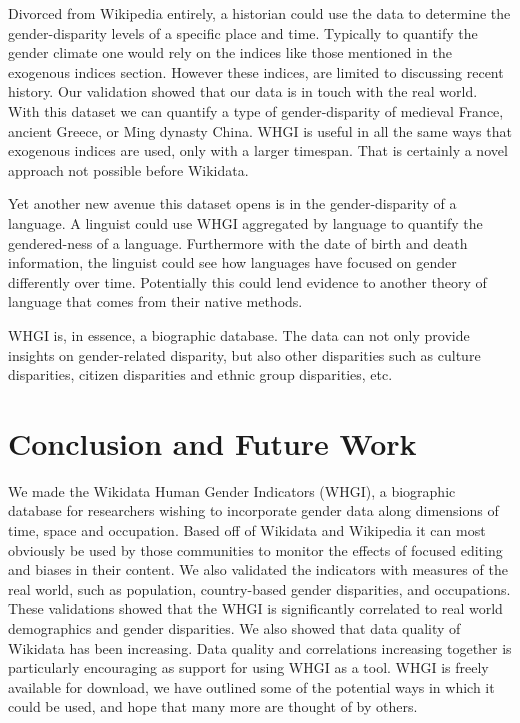 \documentclass{sig-alternate-05-2015}
\begin{document}
Divorced from Wikipedia entirely, a historian could use the data to determine the gender-disparity levels of a specific place and time. Typically to quantify the gender climate one would rely on the indices like those mentioned in the exogenous indices section. However these indices, are limited to discussing recent history. Our validation showed that our data is in touch with the real world. With this dataset we can quantify a type of gender-disparity of medieval France, ancient Greece, or Ming dynasty China. WHGI is useful in all the same ways that exogenous indices are used, only with a larger timespan. That is certainly a novel approach not possible before Wikidata.

Yet another new avenue this dataset opens is in the gender-disparity of a language. A linguist could use WHGI aggregated by language to quantify the gendered-ness of a language. Furthermore with the date of birth and death information, the linguist could see how languages have focused on gender differently over time. Potentially this could lend evidence to another theory of language that comes from their native methods. 

WHGI is, in essence, a biographic database. The data can not only provide insights on gender-related disparity, but also other disparities such as culture disparities, citizen disparities and ethnic group disparities, etc.  

\section{Conclusion and Future Work}
We made the Wikidata Human Gender Indicators (WHGI), a biographic database for researchers wishing to incorporate gender data along dimensions of time, space and occupation. Based off of Wikidata and Wikipedia it can most obviously be used by those communities to monitor the effects of focused editing and biases in their content. We also validated the indicators with measures of the real world, such as population, country-based gender disparities, and occupations. These validations showed that the WHGI is significantly correlated to real world demographics and gender disparities. We also showed that data quality of Wikidata has been increasing. Data quality and correlations increasing together is particularly encouraging as support for using WHGI as a tool. WHGI is freely available for download, we have outlined some of the potential ways in which it could be used, and hope that many more are thought of by others.
\end{document}
